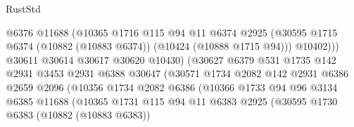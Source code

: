 \begin{lexlean}{RustStd}
\begin{coremodule}
                                    @6376
                                    @11688
                                    (@10365
                                      @1716
                                      @115
                                      @94
                                      @11
                                      @6374
                                      @2925
                                      (@30595
                                        @1715
                                        @6374
                                        (@10882 (@10883 @6374))
                                        (@10424 (@10888 @1715 @94)))
                                      @10402)))
                                @30611
                                @30614
                                @30617
                                @30620
                                @10430)
                              (@30627
                                @6379
                                @531
                                @1735
                                @142
                                @2931
                                @3453
                                @2931
                                @6388
                                @30647
                                (@30571
                                  @1734
                                  @2082
                                  @142
                                  @2931
                                  @6386
                                  @2659
                                  @2096
                                  (@10356
                                    @1734
                                    @2082
                                    @6386
                                    (@10366
                                      @1733
                                      @94
                                      @96
                                      @3134
                                      @6385
                                      @11688
                                      (@10365
                                        @1731
                                        @115
                                        @94
                                        @11
                                        @6383
                                        @2925
                                        (@30595
                                          @1730
                                          @6383
                                          (@10882 (@10883 @6383))

\end{coremodule}
\end{lexlean}

